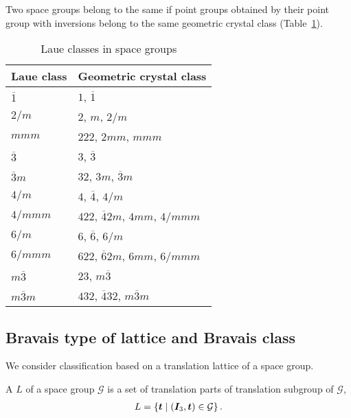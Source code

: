 Two space groups belong to the same  if point groups obtained by their point group with inversions belong to the same geometric crystal class (Table~\ref{tab:laue_class}).

\begin{table}[htb]
  \centering
  \caption{Laue classes in space groups}
  \label{tab:laue_class}
  \begin{tabular}[h]{l|l}
    \hline
    Laue class       & Geometric crystal class \\ \hline
    $\overline{1}$   & $1$, $\overline{1}$ \\
    $2/m$            & $2$, $m$, $2/m$ \\
    $mmm$            & $222$, $2mm$, $mmm$ \\
    $\overline{3}$   & $3$, $\overline{3}$ \\
    $\overline{3}m$  & $32$, $3m$, $\overline{3}m$ \\
    $4/m$            & $4$, $\overline{4}$, $4/m$ \\
    $4/mmm$          & $422$, $\overline{4}2m$, $4mm$, $4/mmm$ \\
    $6/m$            & $6$, $\overline{6}$, $6/m$ \\
    $6/mmm$          & $622$, $\overline{6}2m$, $6mm$, $6/mmm$ \\
    $m\overline{3}$  & $23$, $m\overline{3}$ \\
    $m\overline{3}m$ & $432$, $\overline{4}32$, $m\overline{3}m$ \\ \hline
  \end{tabular}
\end{table}


\subsection{\label{sec:bravais-class}Bravais type of lattice and Bravais class}

We consider classification based on a translation lattice of a space group.

\begin{screen}
  \begin{defn}
    A  $L$ of a space group $\mathcal{G}$ is a set of translation parts of translation subgroup of $\mathcal{G}$,
    \begin{align}
      L = \left\{  \bm{t}  \mathrel{}\middle|\mathrel{}  (\bm{I}_{3}, \bm{t}) \in \mathcal{G}  \right\}.
    \end{align}
  \end{defn}
\end{screen}

